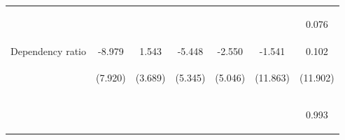 \begin{center}
\begin{tabular}{lcccccc}
\vspace{4pt} & \begin{footnotesize}[0.396]\end{footnotesize} & \begin{footnotesize}[0.400]\end{footnotesize} & \begin{footnotesize}[0.991]\end{footnotesize} & \begin{footnotesize}[0.147]\end{footnotesize} & \begin{footnotesize}[0.071]\end{footnotesize} & \begin{footnotesize}0.076\end{footnotesize} \\
Dependency ratio & -8.979 & 1.543 & -5.448 & -2.550 & -1.541 & 0.102 \\
 & \begin{footnotesize}(7.920)\end{footnotesize} & \begin{footnotesize}(3.689)\end{footnotesize} & \begin{footnotesize}(5.345)\end{footnotesize} & \begin{footnotesize}(5.046)\end{footnotesize} & \begin{footnotesize}(11.863)\end{footnotesize} & \begin{footnotesize}(11.902)\end{footnotesize} \\
\vspace{4pt} & \begin{footnotesize}[0.257]\end{footnotesize} & \begin{footnotesize}[0.676]\end{footnotesize} & \begin{footnotesize}[0.308]\end{footnotesize} & \begin{footnotesize}[0.613]\end{footnotesize} & \begin{footnotesize}[0.897]\end{footnotesize} & \begin{footnotesize}0.993\end{footnotesize} \\

\end{tabular}
\end{center}
